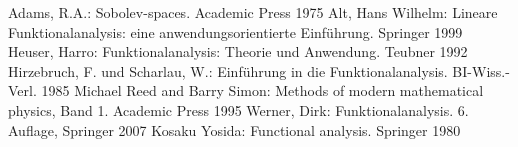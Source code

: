 \printindex

\begin{thebibliography}{50}
 Adams, R.A.: Sobolev-spaces. Academic Press 1975
 Alt, Hans Wilhelm: Lineare Funktionalanalysis: eine
anwendungsorientierte Einführung. Springer 1999
 Heuser, Harro: Funktionalanalysis: Theorie und
Anwendung. Teubner 1992
 Hirzebruch, F. und Scharlau, W.: Einführung
in die Funktionalanalysis. BI-Wiss.-Verl. 1985
 Michael Reed and Barry Simon: Methods of
modern mathematical physics, Band 1. Academic Press 1995
 Werner, Dirk: Funktionalanalysis. 6. Auflage,
Springer 2007
 Kosaku Yosida: Functional analysis. Springer
1980
\end{thebibliography}
